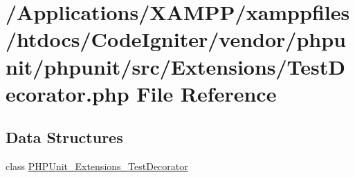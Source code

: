 \hypertarget{_test_decorator_8php}{}\section{/\+Applications/\+X\+A\+M\+P\+P/xamppfiles/htdocs/\+Code\+Igniter/vendor/phpunit/phpunit/src/\+Extensions/\+Test\+Decorator.php File Reference}
\label{_test_decorator_8php}
\subsection*{Data Structures}
\begin{DoxyCompactItemize}
\item 
class \mbox{\hyperlink{class_p_h_p_unit___extensions___test_decorator}{P\+H\+P\+Unit\+\_\+\+Extensions\+\_\+\+Test\+Decorator}}
\end{DoxyCompactItemize}
